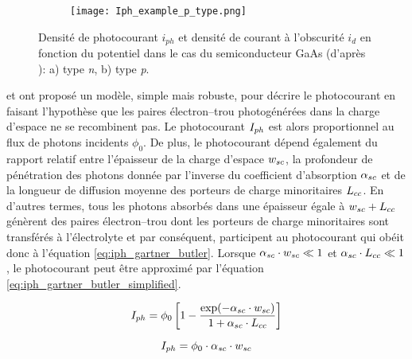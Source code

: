 \begin{refsection}
\begin{figure}[H]
        \begin{subfigure}[b]{0.5\textwidth}
            \centering
            \texttt{[image: Iph\_example\_p\_type.png]}
            \caption{}
            \label{subfig:ch1_Polarization_Curve-ptype}
        \end{subfigure}
        \caption[Densité de photocourant $i_{ph}$ et densité de courant à l'obscurité $i_d$ en fonction du potentiel
            dans le cas du semiconducteur GaAs: 
            a) type \emph{n},
            b) type \emph{p}.]
        {Densité de photocourant $i_{ph}$ et densité de courant à l'obscurité $i_d$ en fonction du potentiel
            dans le cas du semiconducteur GaAs (d'après \citet{Plieth2008}): 
            a) type \emph{n},
            b) type \emph{p}.}
        \label{fig:ch1_photocurrent_examples}
    \end{figure}


    \citet{Gartner1959} et \citet{Butler1977} ont proposé un modèle, simple mais robuste, pour décrire le photocourant
    en faisant l'hypothèse que les paires électron--trou photogénérées dans la charge d'espace ne se recombinent pas. Le photocourant $I_{ph}$
    est alors proportionnel au flux de photons incidents $\phi _0$. De plus, le photocourant dépend également du
    rapport relatif entre l'épaisseur de la charge d'espace $w_{sc}$, la profondeur de pénétration des photons donnée
    par l'inverse du coefficient d'absorption $\alpha _{sc}$ et de la longueur de diffusion moyenne des porteurs de
    charge minoritaires $L_{cc}$. En d'autres termes, tous les
    photons absorbés dans une épaisseur égale à $w_{sc} + L_{cc}$ génèrent des paires électron--trou dont les porteurs de
    charge minoritaires sont transférés à l'électrolyte et par conséquent, participent au photocourant qui obéit donc à
    l'équation \ref{eq:iph_gartner_butler}. Lorsque $\alpha _{sc} \cdot w_{sc} \ll 1$ et $\alpha _{sc} \cdot L_{cc} \ll 1$, le photocourant peut être approximé par l'équation
    \ref{eq:iph_gartner_butler_simplified}.


    \begin{equation}
        I_{ph} = \phi _0 \left[ 1 - \frac{\exp (-\alpha _{sc} \cdot w_{sc})}{1+\alpha _{sc} \cdot
        L_{cc}} \right]
        \label{eq:iph_gartner_butler}
    \end{equation}

     \begin{equation}
        I_{ph} = \phi _0 \cdot \alpha _{sc} \cdot w_{sc}
        \label{eq:iph_gartner_butler_simplified}
    \end{equation}


\end{refsection}
